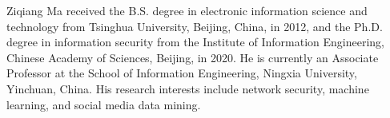 \documentclass[journal]{IEEEtran}
\begin{document}
\begin{IEEEbiography}{Ziqiang Ma} received the B.S. degree in electronic information science and technology from Tsinghua University, Beijing, China, in 2012, and the Ph.D. degree in information security from the Institute of Information Engineering, Chinese Academy of Sciences, Beijing, in 2020. He is currently an Associate Professor at the School of Information Engineering, Ningxia University, Yinchuan, China. His research interests include network security, machine learning, and social media data mining.
\end{IEEEbiography}
\end{document}
